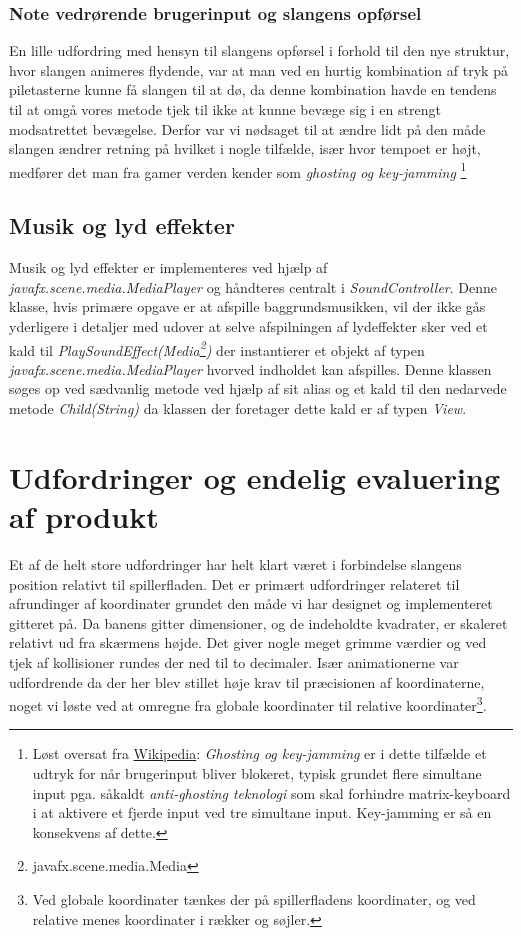 \documentclass[]{article}
\begin{document}
	\subsubsection{Note vedrørende brugerinput og slangens opførsel}
	
	En lille udfordring med hensyn til slangens opførsel i forhold til den nye struktur, hvor slangen animeres flydende, var at man ved en hurtig kombination af tryk på piletasterne kunne få slangen til at dø, da denne kombination havde en tendens til at omgå vores metode tjek til ikke at kunne bevæge sig i en strengt modsatrettet bevægelse. Derfor var vi nødsaget til at ændre lidt på den måde slangen ændrer retning på hvilket i nogle tilfælde, især hvor tempoet er højt, medfører det man fra gamer verden kender som \textit{ghosting og key-jamming} \footnote{Løst oversat fra \href{https://en.wikipedia.org/wiki/Rollover_(key)}{Wikipedia}: \textit{Ghosting og key-jamming} er i dette tilfælde et udtryk for når brugerinput bliver blokeret, typisk grundet flere simultane input pga. såkaldt \textit{anti-ghosting teknologi} som skal forhindre matrix-keyboard i at aktivere et fjerde input ved tre simultane input. Key-jamming er så en konsekvens af dette.}
	
	\subsection{Musik og lyd effekter}
	
	Musik og lyd effekter er implementeres ved hjælp af \textit{javafx.scene.media.MediaPlayer} og håndteres centralt i \textit{SoundController}. Denne klasse, hvis primære opgave er at afspille baggrundsmusikken, vil der ikke gås yderligere i detaljer med udover at selve afspilningen af lydeffekter sker ved et kald til \textit{PlaySoundEffect(Media\footnote{javafx.scene.media.Media})} der instantierer et objekt af typen \textit{javafx.scene.media.MediaPlayer} hvorved indholdet kan afspilles. Denne klassen søges op ved sædvanlig metode ved hjælp af sit alias og et kald til den nedarvede metode \textit{Child(String)} da klassen der foretager dette kald er af typen \textit{View}.

\section{Udfordringer og endelig evaluering af produkt}

Et af de helt store udfordringer har helt klart været i forbindelse slangens position relativt til spillerfladen. Det er primært udfordringer relateret til afrundinger af koordinater grundet den måde vi har designet og implementeret gitteret på. Da banens gitter dimensioner, og de indeholdte kvadrater, er skaleret relativt ud fra skærmens højde. Det giver nogle meget grimme værdier og ved tjek af kollisioner rundes der ned til to decimaler. Især animationerne var udfordrende da der her blev stillet høje krav til præcisionen af koordinaterne, noget vi løste ved at omregne fra globale koordinater til relative koordinater\footnote{Ved globale koordinater tænkes der på spillerfladens koordinater, og ved relative menes koordinater i rækker og søjler.}.
\end{document}
